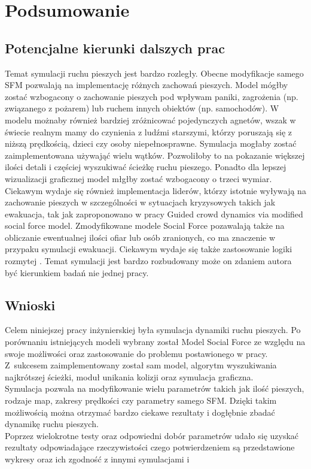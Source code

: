 \chapter{Podsumowanie}
\label{cha:podsumowanie}

\section{Potencjalne kierunki dalszych prac}
Temat symulacji ruchu pieszych jest bardzo rozległy. Obecne modyfikacje samego SFM pozwalają na implementację różnych zachowań pieszych. Model mógłby zostać wzbogacony o zachowanie pieszych pod wpływam paniki, zagrożenia (np. związanego z pożarem) lub ruchem innych obiektów (np. samochodów). W modelu możnaby również bardziej zróżnicować pojedynczych agnetów, wszak w świecie realnym mamy do czynienia z ludźmi starszymi, którzy poruszają się z niższą prędkością, dzieci czy osoby niepełnosprawne. Symulacja mogłaby zostać zaimplementowana używająć wielu wątków. Pozwoliłoby to na pokazanie większej ilości detali i częściej wyszukiwać ścieżkę ruchu pieszego. Ponadto dla lepszej wizualizacji graficznej model młgłby zostać wzbogacony o trzeci wymiar. Ciekawym wydaje się również implementacja liderów, którzy istotnie wyływają na zachowanie pieszych w szczególności w sytuacjach kryzysowych takich jak ewakuacja, tak jak zaproponowano w pracy Guided crowd dynamics via modified social force model\cite{GuideCrowdDynViaModifiedSocialForceModel}. Zmodyfikowane modele Social Force pozawalają także na obliczanie ewentualnej ilości ofiar lub osób zranionych, co ma znaczenie w przypaku symulacji ewakuacji. 
Ciekawym wydaje się także zastosowanie logiki rozmytej \cite{modelingFuzzyLogic}.
Temat symulacji jest bardzo rozbudowany może on zdaniem autora być kierunkiem badań nie jednej pracy. 

\section{Wnioski}
\label{sec:wnioski}

Celem niniejszej pracy inżynierskiej była symulacja dynamiki ruchu pieszych. Po porównaniu istniejących modeli wybrany został Model Social Force ze względu na swoje możliwości oraz zastosowanie do problemu postawionego w pracy. Z~sukcesem zaimplementowany został sam model, algorytm wyszukiwania najkrótszej ścieżki, moduł unikania kolizji oraz symulacja graficzna.\\
Symulacja pozwala na modyfikowanie wielu parametrów takich jak ilość pieszych, rodzaje map, zakresy prędkości czy parametry samego SFM. Dzięki takim możliwością można otrzymać bardzo ciekawe rezultaty i dogłębnie zbadać dynamikę ruchu pieszych.\\
Poprzez wielokrotne testy oraz odpowiedni dobór parametrów udało się uzyskać rezultaty odpowiadające rzeczywistości czego potwierdzeniem są przedstawione wykresy oraz ich zgodność z innymi symulacjami \citep{GuideCrowdDynViaModifiedSocialForceModel} i \citep{SocialForceSuwala}

